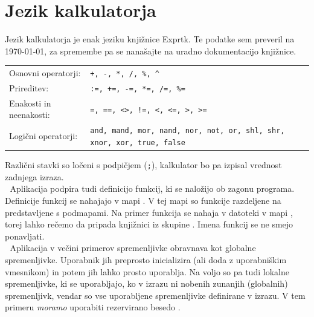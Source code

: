 \documentclass[12pt]{report}
\makeatletter
\newcommand{\wdot}{\textcolor{white}{.}}
\newcommand{\odstavek}{\wdot \\ \wdot \qquad}
\newcommand{\codequote}[1]{\textquote{\texttt{#1}}}
\newcommand{\group}[2]{\parbox{#1}{\setstretch{0.5}\vspace{5pt}\texttt{#2}\vspace{5pt}}}
\newenvironment{alignitemize}
{

\begin{tabular}{@{$\bullet$ }ll}
}{
\end{tabular}

}
\makeatother
\begin{document}
	\section{Jezik kalkulatorja}
		Jezik kalkulatorja je enak jeziku knjižnice Exprtk.
		Te podatke sem preveril na \today, za spremembe pa se nanašajte na uradno dokumentacijo knjižnice.~\cite{exprtk,exprtk_git}
		\begin{alignitemize}
			Osnovni operatorji: &\texttt{+, -, *, /, \%, \^{}} \\
			Prireditev: &\texttt{:=, +=, -=, *=, /=, \%=}\\
			Enakosti in neenakosti: &\texttt{=, ==, <>, !=, <, <=, >, >=}\\
			Logični operatorji: &\group{225pt}{and, mand, mor, nand, nor, not, or, shl, shr, xnor, xor, true, false}\\
			Funkcije: &\group{375pt}{abs, avg, ceil, clamp, equal, erf, erfc, exp, expm1, floor, frac, log, log10, log1p, log2, logn, max, min, mul,  ncdf, nequal, root, round, roundn, sgn, sqrt, sum, swap, trunc}\\
			Trigonometrija: &\group{330pt}{acos, acosh, asin, asinh, atan, atanh, atan2, cos, cosh, cot, csc, sec, sin, sinc, sinh, tan, tanh, hypot, rad2deg, deg2grad, deg2rad, grad2deg}\\
			Nadzor pretoka: &\group{250pt}{if-then-else, trojiški pogojni operator~(?:), switch-case, return}\\
			Zanke: &\texttt{while, for, repeat-until, break, continue}
		\end{alignitemize}
		Različni stavki so ločeni s podpičjem (\texttt{;}), kalkulator bo pa izpisal vrednost zadnjega izraza.\odstavek
		Aplikacija podpira tudi definicijo funkcij, ki se naložijo ob zagonu programa.
		Definicije funkcij se nahajajo v mapi .
		V tej mapi so funkcije razdeljene na  predstavljene s podmapami.
		Na primer funkcija \codequote{add} se nahaja v datoteki  v mapi , torej lahko rečemo da pripada knjižnici  iz skupine .
		Imena funkcij se ne smejo ponavljati.
		\odstavek
		Aplikacija v večini primerov spremenljivke obravnava kot globalne spremenljivke. Uporabnik jih preprosto inicializira \codequote{x := 3} (ali doda z uporabniškim vmesnikom) in potem jih lahko prosto uporablja.
		Na voljo so pa tudi lokalne spremenljivke, ki se uporabljajo, ko v izrazu ni nobenih zunanjih (globalnih) spremenljivk, vendar so vse uporabljene spremenljivke definirane v izrazu. V tem primeru \emph{moramo} uporabiti rezervirano besedo \codequote{var}. 
\end{document}
